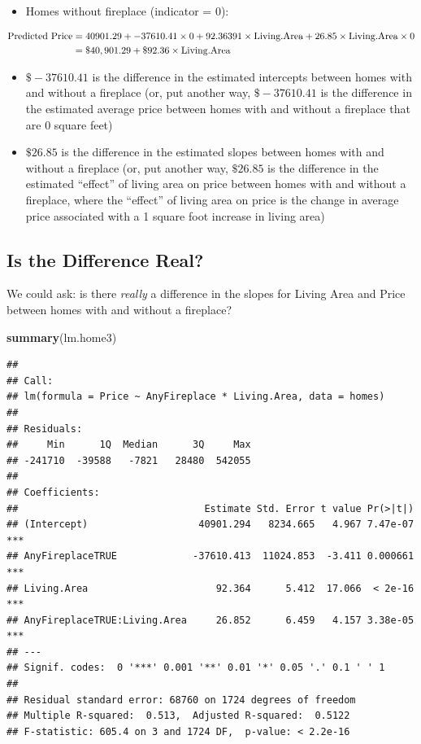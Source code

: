 \documentclass[
]{book}
\newenvironment{Shaded}{\begin{snugshade}}{\end{snugshade}}
\newcommand{\KeywordTok}[1]{\textcolor[rgb]{0.13,0.29,0.53}{\textbf{#1}}}
\newcommand{\NormalTok}[1]{#1}
\providecommand{\tightlist}{%
  \setlength{\itemsep}{0pt}\setlength{\parskip}{0pt}}
\begin{document}
\begin{itemize}
\tightlist
\item
  Homes without fireplace (indicator = 0):
\end{itemize}

\begin{align*}
\hbox{Predicted Price} &= 40901.29 + -37610.41 \times 0 + 92.36391 \times \hbox{Living.Area} + 26.85 \times \hbox{Living.Area} \times 0 \\
&= \$40,901.29 + \$92.36 \times \hbox{Living.Area}
\end{align*}

\begin{itemize}
\tightlist
\item
  \(\$-37610.41\) is the difference in the estimated intercepts between homes with and without a fireplace (or, put another way, \(\$-37610.41\) is the difference in the estimated average price between homes with and without a fireplace that are 0 square feet)
\item
  \(\$26.85\) is the difference in the estimated slopes between homes with and without a fireplace (or, put another way, \(\$26.85\) is the difference in the estimated ``effect'' of living area on price between homes with and without a fireplace, where the ``effect'' of living area on price is the change in average price associated with a 1 square foot increase in living area)
\end{itemize}

\hypertarget{is-the-difference-real}{%
\subsection{Is the Difference Real?}\label{is-the-difference-real}}

We could ask: is there \emph{really} a difference in the slopes for Living Area and Price between homes with and without a fireplace?

\begin{Shaded}
\begin{Highlighting}[]
\KeywordTok{summary}\NormalTok{(lm.home3)}
\end{Highlighting}
\end{Shaded}

\begin{verbatim}
## 
## Call:
## lm(formula = Price ~ AnyFireplace * Living.Area, data = homes)
## 
## Residuals:
##     Min      1Q  Median      3Q     Max 
## -241710  -39588   -7821   28480  542055 
## 
## Coefficients:
##                                Estimate Std. Error t value Pr(>|t|)    
## (Intercept)                   40901.294   8234.665   4.967 7.47e-07 ***
## AnyFireplaceTRUE             -37610.413  11024.853  -3.411 0.000661 ***
## Living.Area                      92.364      5.412  17.066  < 2e-16 ***
## AnyFireplaceTRUE:Living.Area     26.852      6.459   4.157 3.38e-05 ***
## ---
## Signif. codes:  0 '***' 0.001 '**' 0.01 '*' 0.05 '.' 0.1 ' ' 1
## 
## Residual standard error: 68760 on 1724 degrees of freedom
## Multiple R-squared:  0.513,	Adjusted R-squared:  0.5122 
## F-statistic: 605.4 on 3 and 1724 DF,  p-value: < 2.2e-16
\end{verbatim}
\end{document}

